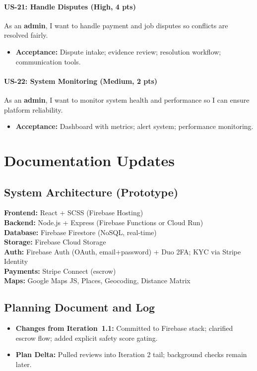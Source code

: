\documentclass[11pt]{article}
\begin{document}
\paragraph{US-21: Handle Disputes (High, 4 pts)}
As an \textbf{admin}, I want to handle payment and job disputes so conflicts are resolved fairly.
\begin{itemize}[leftmargin=1.4em]
  \item \textbf{Acceptance:} Dispute intake; evidence review; resolution workflow; communication tools.
\end{itemize}

\paragraph{US-22: System Monitoring (Medium, 2 pts)}
As an \textbf{admin}, I want to monitor system health and performance so I can ensure platform reliability.
\begin{itemize}[leftmargin=1.4em]
  \item \textbf{Acceptance:} Dashboard with metrics; alert system; performance monitoring.
\end{itemize}

\section{Documentation Updates}

\subsection{System Architecture (Prototype)}
\textbf{Frontend:} React + SCSS (Firebase Hosting)\\
\textbf{Backend:} Node.js + Express (Firebase Functions or Cloud Run)\\
\textbf{Database:} Firebase Firestore (NoSQL, real-time)\\
\textbf{Storage:} Firebase Cloud Storage\\
\textbf{Auth:} Firebase Auth (OAuth, email+password) + Duo 2FA; KYC via Stripe Identity\\
\textbf{Payments:} Stripe Connect (escrow)\\
\textbf{Maps:} Google Maps JS, Places, Geocoding, Distance Matrix

\subsection{Planning Document and Log}
\begin{itemize}[leftmargin=1.4em]
  \item \textbf{Changes from Iteration~1.1:} Committed to Firebase stack; clarified escrow flow; added explicit safety score gating.
  \item \textbf{Plan Delta:} Pulled reviews into Iteration 2 tail; background checks remain later.
\end{itemize}
\end{document}
